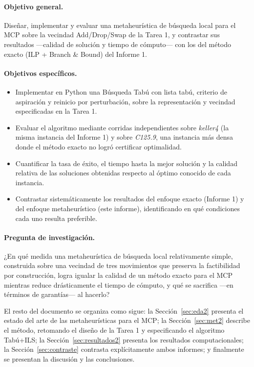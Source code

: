 \paragraph{Objetivo general.} Diseñar, implementar y evaluar una metaheurística de búsqueda local para el MCP sobre la vecindad Add/Drop/Swap de la Tarea 1, y contrastar sus resultados —calidad de solución y tiempo de cómputo— con los del método exacto (ILP + Branch \& Bound) del Informe 1.

\paragraph{Objetivos específicos.}
\begin{itemize}
    \item Implementar en Python una Búsqueda Tabú con lista tabú, criterio de aspiración y reinicio por perturbación, sobre la representación y vecindad especificadas en la Tarea 1.
    \item Evaluar el algoritmo mediante corridas independientes sobre \textit{keller4} (la misma instancia del Informe 1) y sobre \textit{C125.9}, una instancia más densa donde el método exacto no logró certificar optimalidad.
    \item Cuantificar la tasa de éxito, el tiempo hasta la mejor solución y la calidad relativa de las soluciones obtenidas respecto al óptimo conocido de cada instancia.
    \item Contrastar sistemáticamente los resultados del enfoque exacto (Informe 1) y del enfoque metaheurístico (este informe), identificando en qué condiciones cada uno resulta preferible.
\end{itemize}

\paragraph{Pregunta de investigación.} ¿En qué medida una metaheurística de búsqueda local relativamente simple, construida sobre una vecindad de tres movimientos que preserva la factibilidad por construcción, logra igualar la calidad de un método exacto para el MCP mientras reduce drásticamente el tiempo de cómputo, y qué se sacrifica —en términos de garantías— al hacerlo?

El resto del documento se organiza como sigue: la Sección~\ref{sec:eda2} presenta el estado del arte de las metaheurísticas para el MCP; la Sección~\ref{sec:met2} describe el método, retomando el diseño de la Tarea 1 y especificando el algoritmo Tabú+ILS; la Sección~\ref{sec:resultados2} presenta los resultados computacionales; la Sección~\ref{sec:contraste} contrasta explícitamente ambos informes; y finalmente se presentan la discusión y las conclusiones.

